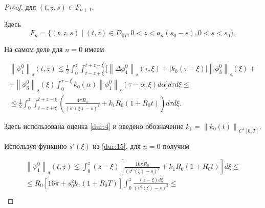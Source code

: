 \begin{proof}
для  $(t, z, s)  \in {F_{n + 1}}.$ 

Здесь   $${F_n} = \{   (t, z, s) \mid {(t, z) \in D_{0T}},

{0 < z < {a_n}(s_0 - s)}, {0 < s < s_0} \}.$$

  На самом деле для  $n = 0$ имеем

\begin{multline*}

\left\| {\psi _1^0} \right\|_s(t,z) \leqslant \frac 12 \int_0^z \int_{t - z + \xi }^{t + z - \xi }

\biggl[ \left\| \Delta \phi _1^0 \right\|_s  (\tau ,\xi )+ 

\left| {k_0}(\tau  - \xi ) \right|\left\| {\phi _3^0}

 \right\|_s(\xi ) + \\ 

 + {\left\| {\phi _3^0} \right\|_s}(\xi )\int_0^{\tau  - \xi } {{k_0}(\alpha )} {\left\| {\phi _1^0} \right\|_s}(\tau

  - \alpha ,\xi ) {d\alpha } \biggr]d\tau d\xi  \leqslant 

  \\

  \leqslant \frac 12 \int_0^z {\int_{t - z + \xi }^{t + z - \xi }

   { {\left( {\frac{{4\pi {R_0}}}{{{{(s'(\xi ) - s)}^2}}} + {k_1}{R_0}\left( {1 + {R_0}t} \right)} \right)} } } d\tau d\xi .

\end{multline*}

 Здесь использована оценка \eqref{dur:4} и введено обозначение ${k_1} = {\left\| {{k_0}(t)} \right\|_{{C^1}\left[ {0, T} \right]}}.$

Используя функцию $s'(\xi )$ из \eqref{dur:15},  для  $n = 0$ получим

\begin{multline*}

{\left\| {\psi _1^0} \right\|_s}(t,z) \leqslant \int_0^z {(z - \xi )} \left[ {\frac{{16\pi {R_0}}}{{{{({v^0}(\xi ) - s)}^2}}}

+ {k_1}{R_0}(1 + {R_0}t)} \right]d\xi  \leqslant 

\\

\leqslant{R_0}\left[ {16\pi  + s_0^2{k_1}(1 + {R_0}T)} \right]\int_0^z

{\frac{{(z - \xi )d\xi }}{{{{({v^0}(\xi ) - s)}^2}}} \leqslant } 

\\


\end{multline*}
\end{proof}
